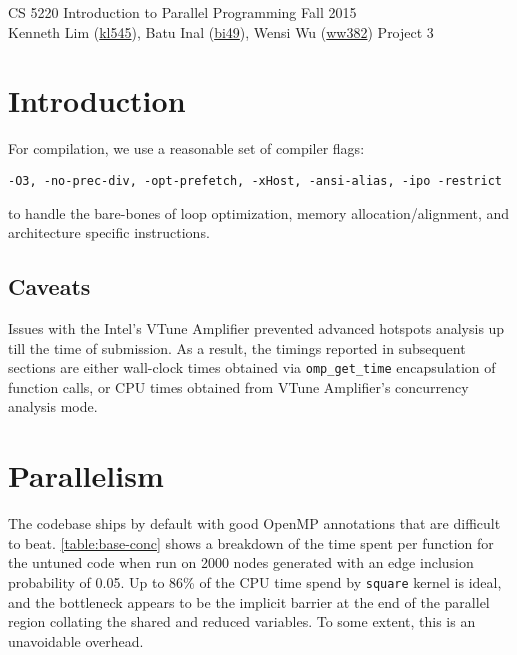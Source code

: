 \documentclass{scrartcl}
\begin{document}
  \begin{framed}
  CS 5220 Introduction to Parallel Programming \hfill Fall 2015 \\
  Kenneth Lim (\href{mailto:kl545@cornell.edu}{kl545}), Batu Inal (\href{mailto:bi49@cornell.edu}{bi49}), Wensi Wu (\href{mailto:ww382@cornell.edu}{ww382}) \hfill Project 3 \hspace{-3ex}
  \end{framed}
  \section{Introduction}
  For compilation, we use a reasonable set of compiler flags:
  \begin{verbatim}-O3, -no-prec-div, -opt-prefetch, -xHost, -ansi-alias, -ipo -restrict\end{verbatim}
  to handle the bare-bones of loop optimization, memory allocation/alignment, and architecture specific instructions.

  \subsection{Caveats}
  Issues with the Intel's VTune Amplifier prevented advanced hotspots analysis up till the time of submission. As a result, the timings reported in subsequent sections are either wall-clock times obtained via \texttt{omp\_get\_time} encapsulation of function calls, or CPU times obtained from VTune Amplifier's concurrency analysis mode.

  \section{Parallelism}
  The codebase ships by default with good OpenMP annotations that are difficult to beat. \autoref{table:base-conc} shows a breakdown of the time spent per function for the untuned code when run on 2000 nodes generated with an edge inclusion probability of 0.05. Up to 86\% of the CPU time spend by \texttt{square} kernel is ideal, and the bottleneck appears to be the implicit barrier at the end of the parallel region collating the shared and reduced variables. To some extent, this is an unavoidable overhead.
\end{document}
